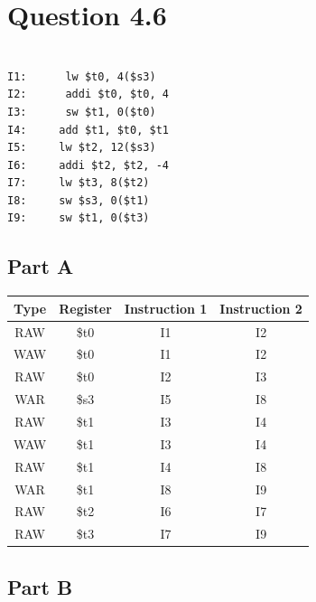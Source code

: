 \documentclass[11pt]{article} %
\begin{document}
\section{Question 4.6}

\begin{verbatim}

I1:      lw $t0, 4($s3)
I2:      addi $t0, $t0, 4
I3:      sw $t1, 0($t0)
I4:     add $t1, $t0, $t1
I5:     lw $t2, 12($s3)
I6:     addi $t2, $t2, -4
I7:     lw $t3, 8($t2)
I8:     sw $s3, 0($t1)
I9:     sw $t1, 0($t3)
\end{verbatim}

\subsection{Part A}

\begin{tabular}{c|c|c|c}
	Type & Register & Instruction 1 & Instruction 2\\\hline
	RAW & \$t0 & I1 & I2 \\
	WAW & \$t0 & I1 & I2 \\
	RAW & \$t0 & I2 & I3 \\
	WAR & \$s3 & I5 & I8 \\
	RAW & \$t1 & I3 & I4 \\
	WAW & \$t1 & I3 & I4 \\
	RAW & \$t1 & I4 & I8 \\
	WAR & \$t1 & I8 & I9 \\
	RAW & \$t2 & I6 & I7 \\
	RAW & \$t3 & I7 & I9 
\end{tabular}

\subsection{Part B}
\end{document}
